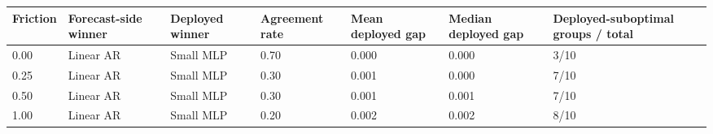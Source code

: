 \begin{tabular}{lllllll}
\toprule
Friction & Forecast-side winner & Deployed winner & Agreement rate & Mean deployed gap & Median deployed gap & Deployed-suboptimal groups / total \\
\midrule
0.00 & Linear AR & Small MLP & 0.70 & 0.000 & 0.000 & 3/10 \\
0.25 & Linear AR & Small MLP & 0.30 & 0.001 & 0.000 & 7/10 \\
0.50 & Linear AR & Small MLP & 0.30 & 0.001 & 0.001 & 7/10 \\
1.00 & Linear AR & Small MLP & 0.20 & 0.002 & 0.002 & 8/10 \\
\bottomrule
\end{tabular}
